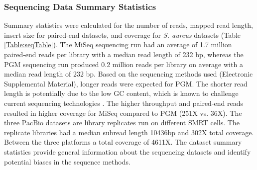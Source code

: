 \documentclass[smallextended]{svjour3}\usepackage[]{graphicx}\usepackage[]{color}
\begin{document}
\subsubsection{Sequencing Data Summary Statistics}
Summary statistics were calculated for the number of reads, mapped read length, insert size for paired-end datasets, and coverage for \textit{S. aureus} datasets (Table \ref{Table:seqTable}). 
The MiSeq sequencing run had an average of 1.7 million paired-end reads per library with a median read length of 232 bp, whereas the PGM sequencing run produced 0.2 million reads per library on average with a median read length of 232 bp. 
Based on the sequencing methods used (Electronic Supplemental Material), longer reads were expected for PGM. The shorter read length is potentially due to the low GC content, which is known to challenge current sequencing technologies \cite{Quail2012}.
The higher throughput and paired-end reads resulted in higher coverage for MiSeq compared to PGM (251X vs. 36X). 
The three PacBio datasets are library replicates run on different SMRT cells.
The replicate libraries had a median subread length 10436bp and 302X total coverage. 
Between the three platforms a total coverage of 4611X. 
The dataset summary statistics provide general information about the sequencing datasets and identify potential biases in the sequence methods.
\end{document}
